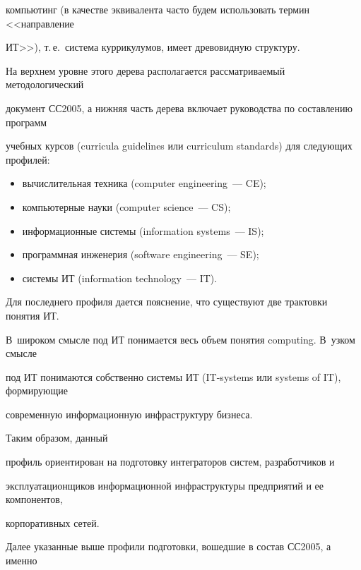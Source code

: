 компьютинг (в качестве эквивалента часто будем использовать термин <<направление 

ИТ>>), т.\,е.\ система куррикулумов, имеет древовидную струк\-туру.

{



}

      

На верхнем уровне этого дерева располагается рассматриваемый методологический 

документ СС2005, а нижняя часть дерева включает руководства по составлению программ 

учебных курсов (curricula guidelines или curriculum standards) для следующих профилей:

\begin{itemize}

\item  вычислительная техника (computer engineering~--- CE);

\item компьютерные науки (computer science~--- CS);

\item информационные системы (information systems~--- IS);

\item программная инженерия (software engineering~--- SE);

\item системы ИТ (information technology~--- IT).

\end{itemize}



Для последнего профиля дается пояснение, что существуют две трактовки понятия ИТ. 

В~широком смысле под ИТ понимается весь объем понятия computing. В~узком смысле 

под ИТ понимаются собственно системы ИТ (IT-systems или systems of IT), формирующие 

современную информационную инфраструктуру бизнеса. 

Таким образом, данный 

профиль ориентирован на подготовку интеграторов систем, разработчиков и 

эксплуатационщиков информационной инфраструктуры предприятий и ее компонентов, 

корпоративных сетей.



Далее указанные выше профили подготовки, вошедшие в состав СС2005, а именно 

